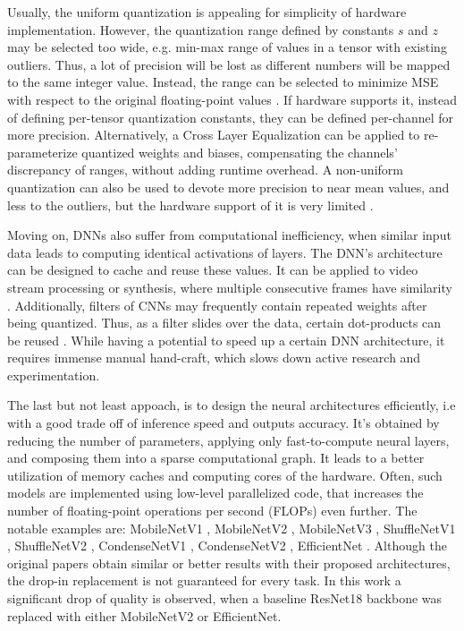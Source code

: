 Usually, the uniform quantization is appealing for simplicity of hardware implementation. However, the quantization range defined by constants $s$ and $z$ may be selected too wide, e.g. min-max range of values in a tensor with existing outliers. Thus, a lot of precision will be lost as different numbers will be mapped to the same integer value. Instead, the range can be selected to minimize MSE with respect to the original floating-point values \cite{quant:mse19, speed:quant-error-analysis15}. If hardware supports it, instead of defining per-tensor quantization constants, they can be defined per-channel for more precision. Alternatively, a Cross Layer Equalization \cite{quant:cle20} can be applied to re-parameterize quantized weights and biases, compensating the channels' discrepancy of ranges, without adding runtime overhead. A non-uniform quantization can also be used to devote more precision to near mean values, and less to the outliers, but the hardware support of it is very limited \cite{quant:non-uniform21}.

Moving on, DNNs also suffer from computational inefficiency, when similar input data leads to computing identical activations of layers. The DNN's architecture can be designed to cache and reuse these values. It can be applied to video stream processing or synthesis, where multiple consecutive frames have similarity \cite{aux:reusing19}. Additionally, filters of CNNs may frequently contain repeated weights after being quantized. Thus, as a filter slides over the data, certain dot-products can be reused \cite{dnn:reusing18}. While having a potential to speed up a certain DNN architecture, it requires immense manual hand-craft, which slows down active research and experimentation.

The last but not least appoach, is to design the neural architectures efficiently, i.e with a good trade off of inference speed and outputs accuracy. It's obtained by reducing the number of parameters, applying only fast-to-compute neural layers, and composing them into a sparse computational graph. It leads to a better utilization of memory caches and computing cores of the hardware. Often, such models are implemented using low-level parallelized code, that increases the number of floating-point operations per second (FLOPs) even further. The notable examples are: MobileNetV1 \cite{dnn:mnv1-17}, MobileNetV2 \cite{dnn:mnv2-18}, MobileNetV3 \cite{dnn:mnv3-19},  ShuffleNetV1 \cite{dnn:shufflenetv1-18}, ShuffleNetV2 \cite{dnn:shufflenetv2-18}, CondenseNetV1 \cite{dnn:condensenetv1-18}, CondenseNetV2 \cite{dnn:condensenetv2-21}, EfficientNet \cite{dnn:efficientnetv1-19}. Although the original papers obtain similar or better results with their proposed architectures, the drop-in replacement is not guaranteed for every task. In this work a significant drop of quality is observed, when a baseline ResNet18 backbone was replaced with either MobileNetV2 or EfficientNet.

